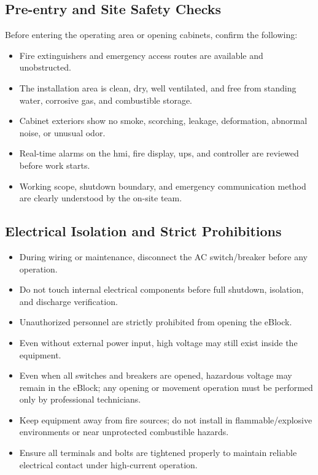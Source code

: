 \documentclass[11pt, a4paper]{article}
\begin{document}
\subsection{Pre-entry and Site Safety Checks}
Before entering the operating area or opening cabinets, confirm the following:
\begin{itemize}[leftmargin=1.5em]
    \item Fire extinguishers and emergency access routes are available and unobstructed.
    \item The installation area is clean, dry, well ventilated, and free from standing water, corrosive gas, and combustible storage.
    \item Cabinet exteriors show no smoke, scorching, leakage, deformation, abnormal noise, or unusual odor.
    \item Real-time alarms on the \gls{hmi}, fire display, \gls{ups}, and controller are reviewed before work starts.
    \item Working scope, shutdown boundary, and emergency communication method are clearly understood by the on-site team.
\end{itemize}

\subsection{Electrical Isolation and Strict Prohibitions}
\begin{itemize}[leftmargin=1.5em]
    \item During wiring or maintenance, disconnect the AC switch/breaker before any operation.
    \item Do not touch internal electrical components before full shutdown, isolation, and discharge verification.
    \item Unauthorized personnel are strictly prohibited from opening the eBlock.
    \item Even without external power input, high voltage may still exist inside the equipment.
    \item Even when all switches and breakers are opened, hazardous voltage may remain in the eBlock; any opening or movement operation must be performed only by professional technicians.
    \item Keep equipment away from fire sources; do not install in flammable/explosive environments or near unprotected combustible hazards.
    \item Ensure all terminals and bolts are tightened properly to maintain reliable electrical contact under high-current operation.
\end{itemize}
\end{document}
